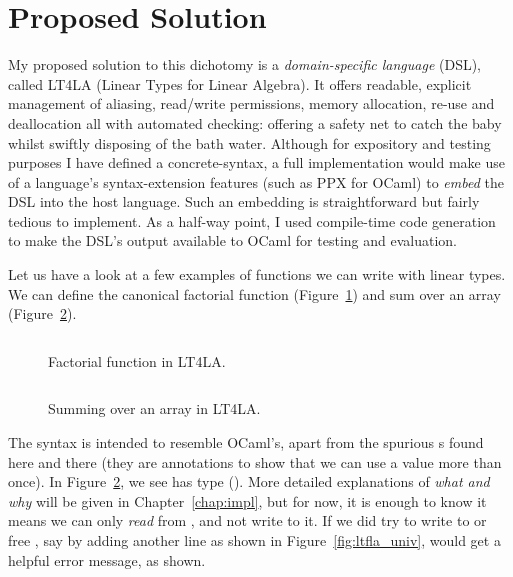 \section{Proposed Solution}

My proposed solution to this dichotomy is a \emph{domain-specific language}
(DSL), called LT4LA (Linear Types for Linear Algebra). It offers readable,
explicit management of aliasing, read/write permissions, memory allocation,
re-use and deallocation all with automated checking: offering a safety net to
catch the baby whilst swiftly disposing of the bath water.  Although for
expository and testing purposes I have defined a concrete-syntax, a full
implementation would make use of a language's syntax-extension features (such
as PPX for OCaml) to \emph{embed} the DSL into the host language. Such an
embedding is straightforward but fairly tedious to implement. As a half-way
point, I used compile-time code generation to make the DSL's output available
to OCaml for testing and evaluation.

Let us have a look at a few examples of functions we can write with linear
types.  We can define the canonical factorial function
(Figure~\ref{fig:ltfla_factorial}) and sum over an array
(Figure~\ref{fig:ltfla_sumarray}).

\begin{figure}[tp]
    \inputminted[linenos, fontsize=\small]{ocaml}{../test/examples/factorial.lt}
    \caption{Factorial function in LT4LA.}\label{fig:ltfla_factorial}
\end{figure}

\begin{figure}[tp]
    \inputminted[linenos, fontsize=\small]{ocaml}{../test/examples/sum_array.lt}
    \caption{Summing over an array in LT4LA.}\label{fig:ltfla_sumarray}
\end{figure}

The syntax is intended to resemble OCaml's, apart from the spurious
s found here and there (they are annotations to show that we can
use a value more than once). In Figure~\ref{fig:ltfla_sumarray}, we see
 has type (). More detailed explanations of
\emph{what and why} will be given in Chapter~\ref{chap:impl}, but for now, it
is enough to know it means we can only \emph{read} from , and not
write to it. If we did try to write to or free , say by adding
another line as shown in Figure~\ref{fig:ltfla_univ}, would get a helpful error
message, as shown.


